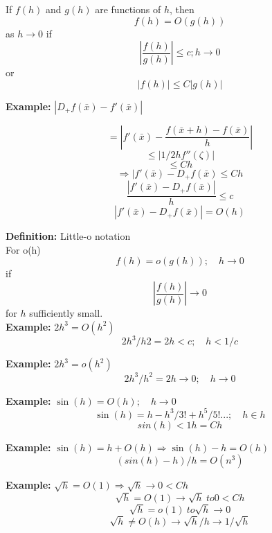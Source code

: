\documentclass[10pt, AMS Euler]{article}
\begin{document}
If $f(h)$ and $g(h)$ are functions of $h$, then 
\[f(h) = O(g(h))\]
as $h \to 0$ if
\[|\frac{f(h)}{g(h)}| \leq c; h\to0\]
or
\[|f(h)| \leq C|g(h)|\]

\textbf{Example:} $|D_+ f(\bar{x}) - f'(\bar{x})|$

\[= |f'(\bar{x}) - \frac{f(\bar{x} + h) - f(\bar{x})}{h}|\]
\[\leq |1/2 h f''(\zeta)|\]
\[\leq Ch\]
\[\Rightarrow |f'(\bar{x}) - D_+ f(\bar{x}) \leq Ch \]
\[\frac{|f'(\bar{x}) - D_+f(\bar{x})|}{h} \leq c\]
\[|f'(\bar{x}) - D_+f(\bar{x})| = O(h)\]

\textbf{Definition:} Little-o notation\\
For o(h)
\[f(h) = o(g(h)); \quad h \to 0\]
if
\[|\frac{f(h)}{g(h)}| \to 0\]
for $h$ sufficiently small.\\

\textbf{Example:} $2h^3 = O(h^2)$
\[2h^3 / h2 = 2h < c; \quad h < 1/c\]

\textbf{Example:} $2h^3 = o(h^2)$
\[2h^3 / h^2 = 2h \to 0; \quad h\to0\]

\textbf{Example:} $\sin(h) = O(h); \quad h\to 0$
\[\sin(h) = h - h^3/3! + h^5/5! ...; \quad h \in h\]
\[sin(h) < 1h = Ch \]

\textbf{Example:} $\sin(h) = h + O(h) \Rightarrow \sin(h) - h = O(h)$
\[(sin(h) - h)/h = O(n^3)\]

\textbf{Example:} $\sqrt{h} = O(1) \Rightarrow \sqrt{h} \to 0 < Ch$
\[\sqrt{h} = O(1) \to \sqrt{h} \ to 0 < Ch\]
\[\sqrt{h} = o(1) \ to \sqrt{h} \to 0\]
\[\sqrt{h} \neq O(h) \to \sqrt{h}/h \to 1/\sqrt{h}\]
\noindent \underline{\hspace{3in}}\\
\end{document}
